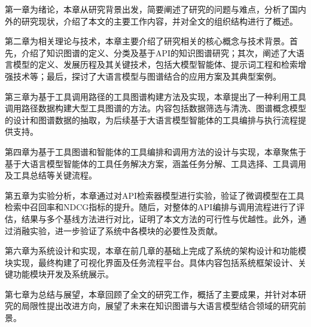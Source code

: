   \indent 第一章为绪论，本章从研究背景出发，简要阐述了研究的问题与难点，分析了国内外的研究现状，介绍了本文的主要工作内容，并对全文的组织结构进行了概述。

  \indent 第二章为相关理论与技术，本章主要介绍了研究相关的核心概念与技术背景。首先，介绍了知识图谱的定义、分类及基于API的知识图谱研究；其次，阐述了大语言模型的定义、发展历程及其关键技术，包括大模型智能体、提示词工程和检索增强技术等；最后，探讨了大语言模型与图谱结合的应用方案及其典型案例。
  
  \indent 第三章为基于工具调用路径的工具图谱构建方法及实现，本章提出了一种利用工具调用路径数据构建大型工具图谱的方法。内容包括数据筛选与清洗、图谱概念模型的设计和图谱数据的抽取，为后续基于大语言模型智能体的工具编排与执行流程提供支持。
  
  \indent 第四章为基于工具图谱和智能体的工具编排和调用方法的设计与实现，本章聚焦于基于大语言模型智能体的工具任务解决方案，涵盖任务分解、工具选择、工具调用及工具总结等关键流程。
  
  \indent 第五章为实验分析，本章通过对API检索器模型进行实验，验证了微调模型在工具检索中召回率和NDCG指标的提升。随后，对整体的API编排与调用流程进行了评估，结果与多个基线方法进行对比，证明了本文方法的可行性与优越性。此外，通过消融实验，进一步验证了系统中各模块的必要性及贡献。
  
  \indent 第六章为系统设计和实现，本章在前几章的基础上完成了系统的架构设计和功能模块实现，最终构建了可视化界面及任务流程平台。具体内容包括系统框架设计、关键功能模块开发及系统展示。
  
  \indent 第七章为总结与展望，本章回顾了全文的研究工作，概括了主要成果，并针对本研究的局限性提出改进方向，展望了未来在知识图谱与大语言模型结合领域的研究前景。